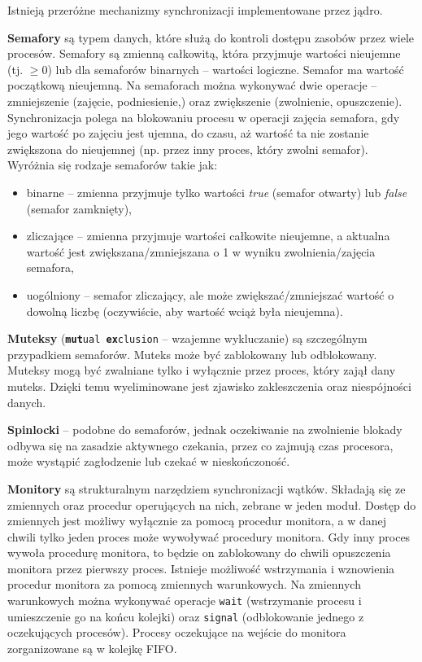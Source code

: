 Istnieją przeróżne mechanizmy synchronizacji implementowane przez jądro.

\textbf{Semafory} są typem danych, które służą do kontroli dostępu zasobów przez wiele procesów. Semafory są zmienną całkowitą, która przyjmuje wartości nieujemne (tj. $\ge 0$) lub dla semaforów binarnych -- wartości logiczne. Semafor ma wartość początkową nieujemną. Na semaforach można wykonywać dwie operacje -- zmniejszenie (zajęcie, podniesienie,) oraz zwiększenie (zwolnienie, opuszczenie). Synchronizacja polega na blokowaniu procesu w operacji zajęcia semafora, gdy jego wartość po zajęciu jest ujemna, do czasu, aż wartość ta nie zostanie zwiększona do nieujemnej (np. przez inny proces, który zwolni semafor). Wyróżnia się rodzaje semaforów takie jak:
\begin{itemize}
\item binarne -- zmienna przyjmuje tylko wartości \textit{true} (semafor otwarty) lub \textit{false} (semafor zamknięty),
\item zliczające -- zmienna przyjmuje wartości całkowite nieujemne, a aktualna wartość jest zwiększana/zmniejszana o 1 w wyniku zwolnienia/zajęcia semafora,
\item uogólniony -- semafor zliczający, ale może zwiększać/zmniejszać wartość o dowolną liczbę (oczywiście, aby wartość wciąż była nieujemna).
\end{itemize}

\textbf{Muteksy} (\texttt{\textbf{mut}ual \textbf{ex}clusion} -- wzajemne wykluczanie) są szczególnym przypadkiem semaforów. Muteks może być zablokowany lub odblokowany. Muteksy mogą być zwalniane tylko i wyłącznie przez proces, który zajął dany muteks. Dzięki temu wyeliminowane jest zjawisko zakleszczenia oraz niespójności danych.

\textbf{Spinlocki} -- podobne do semaforów, jednak oczekiwanie na zwolnienie blokady odbywa się na zasadzie aktywnego czekania, przez co zajmują czas procesora, może wystąpić zagłodzenie lub czekać w nieskończoność.

\textbf{Monitory} są strukturalnym narzędziem synchronizacji wątków. Składają się ze zmiennych oraz procedur operujących na nich, zebrane w jeden moduł. Dostęp do zmiennych jest możliwy wyłącznie za pomocą procedur monitora, a w danej chwili tylko jeden proces może wywoływać procedury monitora. Gdy inny proces wywoła procedurę monitora, to będzie on zablokowany do chwili opuszczenia monitora przez pierwszy proces. Istnieje możliwość wstrzymania i wznowienia procedur monitora za pomocą zmiennych warunkowych. Na zmiennych warunkowych można wykonywać operacje \texttt{wait} (wstrzymanie procesu i umieszczenie go na końcu kolejki) oraz \texttt{signal} (odblokowanie jednego z oczekujących procesów). Procesy oczekujące na wejście do monitora zorganizowane są w kolejkę FIFO.